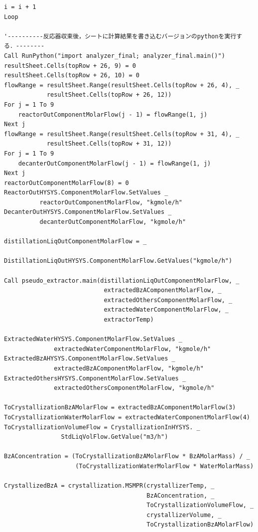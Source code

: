 \documentclass[a4j]{jsreport}
\begin{document}
\begin{lstlisting}[caption=HYSYSとpythonを繋ぐコード]
    i = i + 1
Loop

'----------反応器収束後，シートに計算結果を書き込むバージョンのpythonを実行する．--------
Call RunPython("import analyzer_final; analyzer_final.main()")
resultSheet.Cells(topRow + 26, 9) = 0
resultSheet.Cells(topRow + 26, 10) = 0
flowRange = resultSheet.Range(resultSheet.Cells(topRow + 26, 4), _
            resultSheet.Cells(topRow + 26, 12))
For j = 1 To 9
    reactorOutComponentMolarFlow(j - 1) = flowRange(1, j)
Next j
flowRange = resultSheet.Range(resultSheet.Cells(topRow + 31, 4), _
            resultSheet.Cells(topRow + 31, 12))
For j = 1 To 9
    decanterOutComponentMolarFlow(j - 1) = flowRange(1, j)
Next j
reactorOutComponentMolarFlow(8) = 0
ReactorOutHYSYS.ComponentMolarFlow.SetValues _
          reactorOutComponentMolarFlow, "kgmole/h"
DecanterOutHYSYS.ComponentMolarFlow.SetValues _
          decanterOutComponentMolarFlow, "kgmole/h"

distillationLiqOutComponentMolarFlow = _
          DistillationLiqOutHYSYS.ComponentMolarFlow.GetValues("kgmole/h")

Call pseudo_extractor.main(distillationLiqOutComponentMolarFlow, _
                            extractedBzAComponentMolarFlow, _
                            extractedOthersComponentMolarFlow, _
                            extractedWaterComponentMolarFlow, _
                            extractorTemp)

ExtractedWaterHYSYS.ComponentMolarFlow.SetValues _
              extractedWaterComponentMolarFlow, "kgmole/h"
ExtractedBzAHYSYS.ComponentMolarFlow.SetValues _
              extractedBzAComponentMolarFlow, "kgmole/h"
ExtractedOthersHYSYS.ComponentMolarFlow.SetValues _
              extractedOthersComponentMolarFlow, "kgmole/h"

ToCrystallizationBzAMolarFlow = extractedBzAComponentMolarFlow(3)
ToCrystallizationWaterMolarFlow = extractedWaterComponentMolarFlow(4)
ToCrystallizationVolumeFlow = CrystallizationInHYSYS. _
                StdLiqVolFlow.GetValue("m3/h")

BzAConcentration = (ToCrystallizationBzAMolarFlow * BzAMolarMass) / _
                    (ToCrystallizationWaterMolarFlow * WaterMolarMass)

CrystallizedBzA = crystallization.MSMPR(crystallizerTemp, _
                                        BzAConcentration, _
                                        ToCrystallizationVolumeFlow, _
                                        crystallizerVolume, _
                                        ToCrystallizationBzAMolarFlow)


\end{lstlisting}
\end{document}
